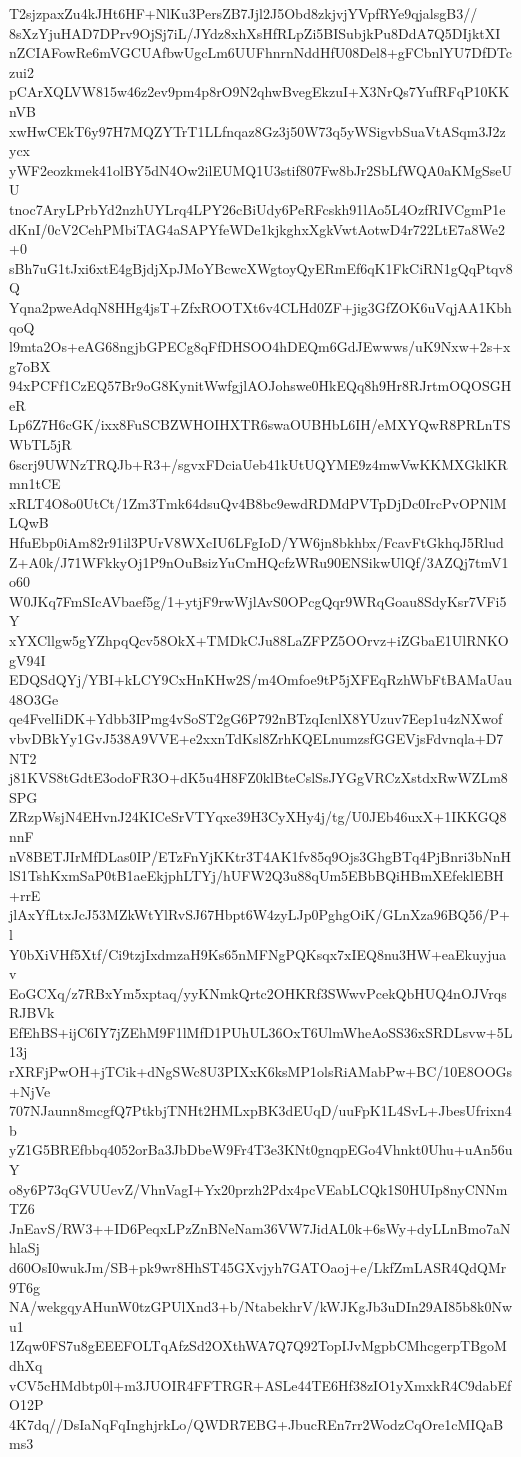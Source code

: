 T2sjzpaxZu4kJHt6HF+NlKu3PersZB7Jjl2J5Obd8zkjvjYVpfRYe9qjalsgB3//
8sXzYjuHAD7DPrv9OjSj7iL/JYdz8xhXsHfRLpZi5BISubjkPu8DdA7Q5DIjktXI
nZCIAFowRe6mVGCUAfbwUgcLm6UUFhnrnNddHfU08Del8+gFCbnlYU7DfDTczui2
pCArXQLVW815w46z2ev9pm4p8rO9N2qhwBvegEkzuI+X3NrQs7YufRFqP10KKnVB
xwHwCEkT6y97H7MQZYTrT1LLfnqaz8Gz3j50W73q5yWSigvbSuaVtASqm3J2zycx
yWF2eozkmek41olBY5dN4Ow2ilEUMQ1U3stif807Fw8bJr2SbLfWQA0aKMgSseUU
tnoc7AryLPrbYd2nzhUYLrq4LPY26cBiUdy6PeRFcskh91lAo5L4OzfRIVCgmP1e
dKnI/0cV2CehPMbiTAG4aSAPYfeWDe1kjkghxXgkVwtAotwD4r722LtE7a8We2+0
sBh7uG1tJxi6xtE4gBjdjXpJMoYBcwcXWgtoyQyERmEf6qK1FkCiRN1gQqPtqv8Q
Yqna2pweAdqN8HHg4jsT+ZfxROOTXt6v4CLHd0ZF+jig3GfZOK6uVqjAA1KbhqoQ
l9mta2Os+eAG68ngjbGPECg8qFfDHSOO4hDEQm6GdJEwwws/uK9Nxw+2s+xg7oBX
94xPCFf1CzEQ57Br9oG8KynitWwfgjlAOJohswe0HkEQq8h9Hr8RJrtmOQOSGHeR
Lp6Z7H6cGK/ixx8FuSCBZWHOIHXTR6swaOUBHbL6IH/eMXYQwR8PRLnTSWbTL5jR
6scrj9UWNzTRQJb+R3+/sgvxFDciaUeb41kUtUQYME9z4mwVwKKMXGklKRmn1tCE
xRLT4O8o0UtCt/1Zm3Tmk64dsuQv4B8bc9ewdRDMdPVTpDjDc0IrcPvOPNlMLQwB
HfuEbp0iAm82r91il3PUrV8WXcIU6LFgIoD/YW6jn8bkhbx/FcavFtGkhqJ5Rlud
Z+A0k/J71WFkkyOj1P9nOuBsizYuCmHQcfzWRu90ENSikwUlQf/3AZQj7tmV1o60
W0JKq7FmSIcAVbaef5g/1+ytjF9rwWjlAvS0OPcgQqr9WRqGoau8SdyKsr7VFi5Y
xYXCllgw5gYZhpqQcv58OkX+TMDkCJu88LaZFPZ5OOrvz+iZGbaE1UlRNKOgV94I
EDQSdQYj/YBI+kLCY9CxHnKHw2S/m4Omfoe9tP5jXFEqRzhWbFtBAMaUau48O3Ge
qe4FvelIiDK+Ydbb3IPmg4vSoST2gG6P792nBTzqIcnlX8YUzuv7Eep1u4zNXwof
vbvDBkYy1GvJ538A9VVE+e2xxnTdKsl8ZrhKQELnumzsfGGEVjsFdvnqla+D7NT2
j81KVS8tGdtE3odoFR3O+dK5u4H8FZ0klBteCslSsJYGgVRCzXstdxRwWZLm8SPG
ZRzpWsjN4EHvnJ24KICeSrVTYqxe39H3CyXHy4j/tg/U0JEb46uxX+1IKKGQ8nnF
nV8BETJIrMfDLas0IP/ETzFnYjKKtr3T4AK1fv85q9Ojs3GhgBTq4PjBnri3bNnH
lS1TshKxmSaP0tB1aeEkjphLTYj/hUFW2Q3u88qUm5EBbBQiHBmXEfeklEBH+rrE
jlAxYfLtxJcJ53MZkWtYlRvSJ67Hbpt6W4zyLJp0PghgOiK/GLnXza96BQ56/P+l
Y0bXiVHf5Xtf/Ci9tzjIxdmzaH9Ks65nMFNgPQKsqx7xIEQ8nu3HW+eaEkuyjuav
EoGCXq/z7RBxYm5xptaq/yyKNmkQrtc2OHKRf3SWwvPcekQbHUQ4nOJVrqsRJBVk
EfEhBS+ijC6IY7jZEhM9F1lMfD1PUhUL36OxT6UlmWheAoSS36xSRDLsvw+5L13j
rXRFjPwOH+jTCik+dNgSWc8U3PIXxK6ksMP1olsRiAMabPw+BC/10E8OOGs+NjVe
707NJaunn8mcgfQ7PtkbjTNHt2HMLxpBK3dEUqD/uuFpK1L4SvL+JbesUfrixn4b
yZ1G5BREfbbq4052orBa3JbDbeW9Fr4T3e3KNt0gnqpEGo4Vhnkt0Uhu+uAn56uY
o8y6P73qGVUUevZ/VhnVagI+Yx20przh2Pdx4pcVEabLCQk1S0HUIp8nyCNNmTZ6
JnEavS/RW3++ID6PeqxLPzZnBNeNam36VW7JidAL0k+6sWy+dyLLnBmo7aNhlaSj
d60OsI0wukJm/SB+pk9wr8HhST45GXvjyh7GATOaoj+e/LkfZmLASR4QdQMr9T6g
NA/wekgqyAHunW0tzGPUlXnd3+b/NtabekhrV/kWJKgJb3uDIn29AI85b8k0Nwu1
1Zqw0FS7u8gEEEFOLTqAfzSd2OXthWA7Q7Q92TopIJvMgpbCMhcgerpTBgoMdhXq
vCV5cHMdbtp0l+m3JUOIR4FFTRGR+ASLe44TE6Hf38zIO1yXmxkR4C9dabEfO12P
4K7dq//DsIaNqFqInghjrkLo/QWDR7EBG+JbucREn7rr2WodzCqOre1cMIQaBms3
